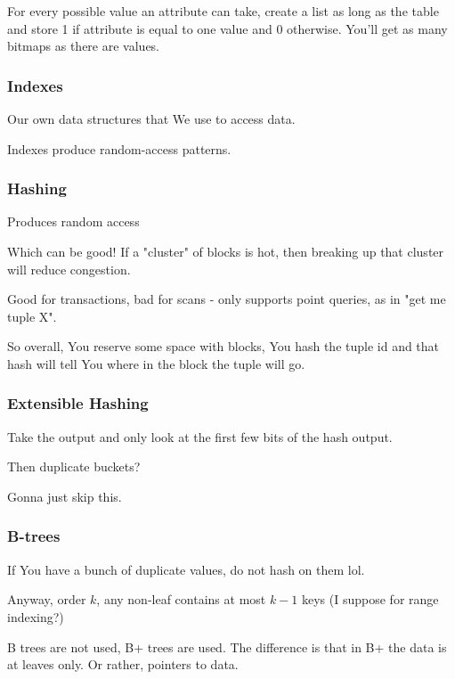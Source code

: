 \documentclass{article}
\begin{document}
				For every possible value an attribute can take, create a list as long as the table and store 1 if attribute is equal to one value and 0 otherwise. You'll get as many bitmaps as there are values.
				
			\subsubsection{Indexes}
			
				Our own data structures that We use to access data.
				
				Indexes produce random-access patterns.
				
			\subsubsection{Hashing}
			
				Produces random access
				
				Which can be good! If a "cluster" of blocks is hot, then breaking up that cluster will reduce congestion.
				
				Good for transactions, bad for scans - only supports point queries, as in "get me tuple X".
				
				So overall, You reserve some space with blocks, You hash the tuple id and that hash will tell You where in the block the tuple will go.
				
			\subsubsection{Extensible Hashing}
			
				Take the output and only look at the first few bits of the hash output.
				
				Then duplicate buckets?
				
				Gonna just skip this.
				
			\subsubsection{B-trees}
			
				If You have a bunch of duplicate values, do not hash on them lol.
				
				Anyway, order $k$, any non-leaf contains at most $k-1$ keys (I suppose for range indexing?)
				
				B trees are not used, B+ trees are used. The difference is that in B+ the data is at leaves only. Or rather, pointers to data.
				
\end{document}

